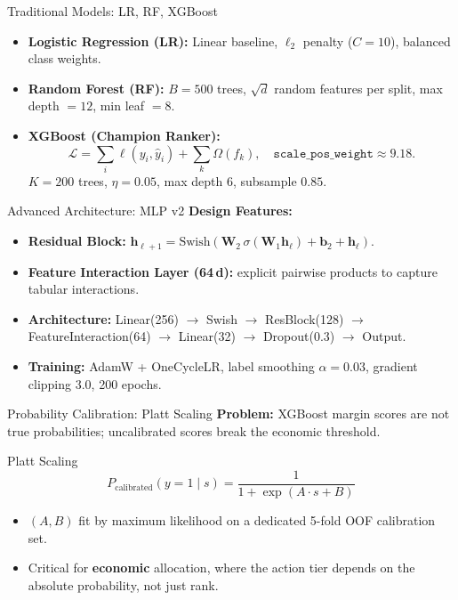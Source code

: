 \documentclass[10pt]{beamer}
\begin{document}
\begin{frame}{\textrm{Traditional Models: LR, RF, XGBoost}}
    \begin{itemize}
        \item \textbf{Logistic Regression (LR):} Linear baseline, $\ell_2$ penalty ($C=10$), balanced class weights.
        \item \textbf{Random Forest (RF):} $B=500$ trees, $\sqrt{d}$ random features per split, max depth $=12$, min leaf $=8$.
        \item \textbf{XGBoost (Champion Ranker):}
        \[
            \mathcal{L} = \sum_{i} \ell(y_i, \hat{y}_i) + \sum_{k} \Omega(f_k),
            \quad \texttt{scale\_pos\_weight}\!\approx\!9.18.
        \]
        $K=200$ trees, $\eta=0.05$, max depth $6$, subsample $0.85$.
    \end{itemize}
\end{frame}

\begin{frame}{\textrm{Advanced Architecture: MLP v2}}
    \textbf{Design Features:}
    \begin{itemize}
        \item \textbf{Residual Block:} $\mathbf{h}_{\ell+1} = \text{Swish}(\mathbf{W}_2 \,\sigma(\mathbf{W}_1 \mathbf{h}_\ell) + \mathbf{b}_2 + \mathbf{h}_\ell)$.
        \item \textbf{Feature Interaction Layer (64\,d):} explicit pairwise products to capture tabular interactions.
        \item \textbf{Architecture:} Linear(256) $\to$ Swish $\to$ ResBlock(128) $\to$ FeatureInteraction(64) $\to$ Linear(32) $\to$ Dropout(0.3) $\to$ Output.
        \item \textbf{Training:} AdamW + OneCycleLR, label smoothing $\alpha=0.03$, gradient clipping $3.0$, 200 epochs.
    \end{itemize}
\end{frame}

\begin{frame}{\textrm{Probability Calibration: Platt Scaling}}
    \textbf{Problem:} XGBoost margin scores are not true probabilities; uncalibrated scores break the economic threshold.
    \begin{block}{Platt Scaling}
        \[
            P_{\text{calibrated}}(y=1\mid s) = \frac{1}{1 + \exp(A\cdot s + B)}
        \]
    \end{block}
    \begin{itemize}
        \item $(A, B)$ fit by maximum likelihood on a dedicated 5-fold OOF calibration set.
        \item Critical for \textbf{economic} allocation, where the action tier depends on the absolute probability, not just rank.
    \end{itemize}
\end{frame}
\end{document}

